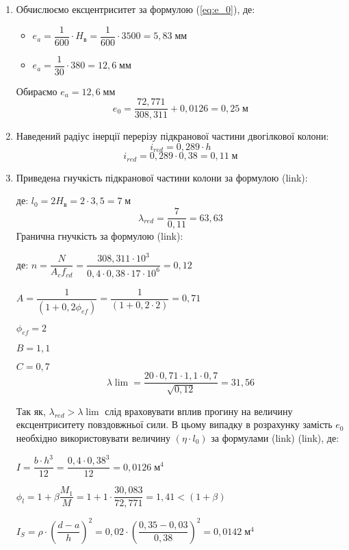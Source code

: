 \documentclass[a4paper,14pt]{article}
\begin{document}
\begin{enumerate}
    \item Обчислюємо ексцентриситет за формулою (\ref{eq:e_0}),
    де: \begin{itemize}
            \item $e_a = \dfrac{1}{600} \cdot H_\textit{в} =\dfrac{1}{600} \cdot 3500 = 5,83\;\textit{мм}$
            \item $e_a = \dfrac{1}{30} \cdot 380 = 12,6\;\textit{мм}$
        \end{itemize}
    Обираємо $e_a = 12,6\;\textit{мм}$
    $$e_0 = \dfrac{72,771}{308,311}+0,0126 = 0,25\;\textit{м}$$
\item Наведений радіус інерції перерізу підкранової частини двогілкової колони:
    \begin{equation}
        i_{red} = 0,289 \cdot h
    \end{equation}
    $$ i_{red} = 0,289 \cdot 0,38 = 0,11\;\textit{м}$$
\item Приведена гнучкість підкранової частини колони за формулою (link):
    
    де: $l_0 = 2H_\textit{в} = 2 \cdot 3,5 = 7\;\textit{м}$
    $$\lambda_{red} = \dfrac{7}{0,11} = 63,63$$
    Гранична гнучкість за формулою (link):
    
    де: $n = \dfrac{N}{A_cf_{cd}} = \dfrac{308,311 \cdot 10^3}{0,4 \cdot 0,38 \cdot 17 \cdot 10^6} = 0,12$

        $A = \dfrac{1}{(1+0,2\phi_{ef})} = \dfrac{1}{(1+0,2 \cdot 2)} = 0,71$

        $\phi_{ef} = 2$

        $B = 1,1$

        $C = 0,7$
        $$\lambda\lim = \dfrac{20 \cdot 0,71 \cdot 1,1 \cdot 0,7}{\sqrt{0,12}} = 31,56$$

    Так як, $\lambda_{red} > \lambda\lim$ слід враховувати вплив прогину на величину ексцентриситету повздовжньої сили. В цьому випадку в розрахунку замість $e_0$ необхідно використовувати
    величину $(\eta \cdot l_0)$ за формулами (link) (link), де: 
    
    $I = \dfrac{b \cdot h^3}{12} = \dfrac{0,4 \cdot 0,38^3}{12} = 0,0126\;\textit{м}^4$

    $\phi_l = 1 + \beta \dfrac{M_1}{M} = 1 + 1 \cdot \dfrac{30,083}{72,771} = 1,41 < (1 + \beta)$

    $I_S = \rho \cdot \left(\dfrac{d - a}{h}\right)^2 = 0,02 \cdot \left(\dfrac{0,35 - 0,03}{0,38}\right)^2 = 0,0142\;\textit{м}^4$


\end{enumerate}
\end{document}
